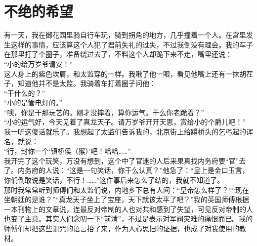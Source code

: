 \fancyhead[RO]{} %
\fancyhead[LE]{} %
\chapter*{不绝的希望}
\thispagestyle{empty}
有一天，我在御花园里骑自行车玩，骑到拐角的地方，几乎撞着一个人。在宫里发生这样的事情，应该算这个人犯了君前失礼的过失，不过我倒没有理会。我的车子在那里打了个圈子，准备绕过去了，不料这个人却跪下来不走，嘴里还说：\\

“小的给万岁爷请安！”\\

这人身上的紫色坎肩，和太监穿的一样。我瞅了他一眼，看见他嘴上还有一抹胡茬子，知道他并不是太监。我骑着车打着圈子问他：\\

“干什么的？”\\

“小的是管电灯的。”\\

“噢，你是干那玩艺的。刚才没摔着，算你运气。干么你老跪着？”\\

“小的运气好，今天见着了真龙天子。请万岁爷开开天恩，赏给小的个爵儿吧！”\\

我一听这傻话就乐了。我想起了太监们告诉我的，北京街上给蹲桥头的乞丐起的诨名，就说：\\

“行，封你一个‘镇桥侯（猴）’吧！哈哈……”\\

我开完了这个玩笑，万没有想到，这个中了官迷的人后来果真找内务府要“官”去了。内务府的人说：“这是一句笑话，你干么认真？”他急了：“皇上是金口玉言，你们倒敢说是笑话，不行！……”这件事后来怎么了结的，我就不知道了。\\

那时我常常听到师傅们和太监们说，内地乡下总有人间：“皇帝怎么样了？”“现在坐朝廷的是谁？”“真龙天子坐上了宝座，天下就该太平了吧？”我的英国师傅根据一本刊物上的文章说，连最反对帝制的人也对共和感到了失望，可见反对帝制的人也变了主意。其实人们念叨一下“前清”，不过是表示对军阀灾难的痛恨而已。我的师傅们却把这些诅咒的语言抬了来，作为人心思旧的证据，也成了对我使用的教材。\\

